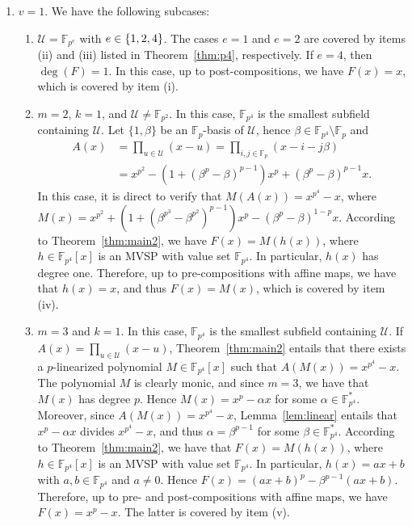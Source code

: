 \documentclass[11pt]{amsart}
\newcommand{\F}{\mathbb{F}}
\theoremstyle{definition}
\theoremstyle{remark}
\begin{document}
\begin{enumerate}[1.]
\item $v=1$. We have the following subcases:

\begin{enumerate}
\item $\mathcal U=\F_{p^e}$ with $e\in \mathcal \{1, 2, 4\}$. The cases $e=1$ and $e=2$ are covered by items (ii) and (iii) listed in  Theorem~\ref{thm:p4}, respectively. If $e=4$, then $\deg(F)=1$. In this case, up to post-compositions, we have $F(x)=x$, which is covered by item (i).

\item $m=2$, $k=1$, and $\mathcal U\ne \F_{p^2}$. In this case, $\F_{p^4}$ is the smallest subfield containing $\mathcal U$. Let $\{1, \beta\}$ be an $\F_p$-basis of $\mathcal U$, hence $\beta\in \F_{p^4}\setminus \F_p$ and 
\begin{align*}
A(x) &= \prod_{u\in \mathcal U}(x-u) = \prod_{i, j\in \mathbb{F}_p}(x-i-j\beta) \\
     &= x^{p^2}-(1+(\beta^p-\beta)^{p-1})x^p+(\beta^p-\beta)^{p-1}x.
\end{align*}
In this case, it is direct to verify that $M(A(x))=x^{p^4}-x$, where $M(x)=x^{p^2}+(1+(\beta^{p^3}-\beta^{p^2})^{p-1})x^p-(\beta^p-\beta)^{1-p}x$. According to Theorem~\ref{thm:main2}, we have $F(x)=M(h(x))$, where $h\in \F_{p^4}[x]$ is an MVSP with value set $\F_{p^4}$. In particular, $h(x)$ has degree one. Therefore, up to pre-compositions with affine maps, we have that  $h(x)=x$, and thus $F(x)=M(x)$, which is covered by item (iv). 


\item $m=3$ and $k=1$.  In this case, $\F_{p^4}$ is the smallest subfield containing $\mathcal U$. If $A(x)=\prod_{u\in \mathcal U}(x-u)$, Theorem~\ref{thm:main2} entails that there exists a $p$-linearized polynomial $M\in \F_{p^4}[x]$ such that $A(M(x))=x^{p^4}-x$. The polynomial $M$ is clearly monic, and since $m=3$, we have that $M(x)$ has degree $p$. Hence $M(x)=x^p-\alpha x$ for some $\alpha\in \F_{p^4}^*$. Moreover, since $A(M(x))=x^{p^4}-x$, Lemma~\ref{lem:linear} entails that $x^p-\alpha x$ divides $x^{p^4}-x$, and thus $\alpha=\beta^{p-1}$ for some $\beta\in \F_{p^4}^*$. According to Theorem~\ref{thm:main2}, we have that $F(x)=M(h(x))$, where $h\in \F_{p^4}[x]$ is an MVSP with value set $\F_{p^4}$. In particular, $h(x)=ax+b$ with $a, b\in \F_{p^4}$ and $a\ne 0$. Hence $F(x)=(ax+b)^p-\beta^{p-1}(ax+b)$. Therefore, up to pre- and post-compositions with affine maps, we have  $F(x)=x^p-x$. The latter is covered by item (v). 





\end{enumerate}
\end{enumerate}
\end{document}
